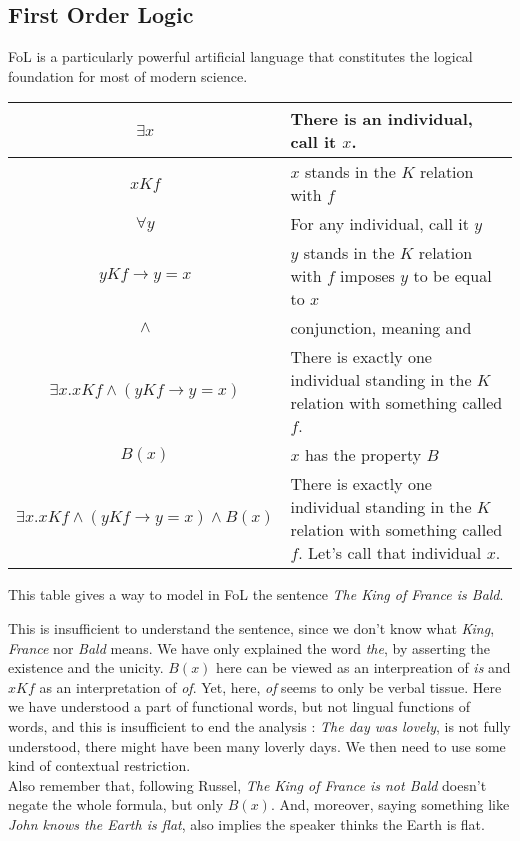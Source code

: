 \documentclass{cours}
\begin{document}
\subsection{First Order Logic}
FoL is a particularly powerful artificial language that constitutes the logical foundation for most of modern science. 
\begin{center}
    \begin{tabular}{cp{}}
        $\exists x$ & There is an individual, call it $x$.\\
        \midrule
        $xKf$ & $x$ stands in the $K$ relation with $f$\\
        \midrule
        $\forall y$ & For any individual, call it $y$\\
        \midrule
        $yKf \rightarrow y = x$ & $y$ stands in the $K$ relation with $f$ imposes $y$ to be equal to $x$\\
        \midrule
        $\wedge$ & conjunction, meaning and\\
        \midrule
        $\exists x.xKf\wedge \left(yKf \rightarrow y = x\right)$ & There is exactly one individual standing in the $K$ relation with something called $f$.\\
        \midrule
        $B(x)$ & $x$ has the property $B$\\
        \midrule
        $\exists x.xKf\wedge \left(yKf \rightarrow y = x\right) \wedge B(x)$ & There is exactly one individual standing in the $K$ relation with something called $f$. Let's call that individual $x$.
    \end{tabular}
\end{center}
This table gives a way to model in FoL the sentence \textsl{The King of France is Bald}.

This is insufficient to understand the sentence, since we don't know what \textsl{King}, \textsl{France} nor \textsl{Bald} means. We have only explained the word \textsl{the}, by asserting the existence and the unicity. $B(x)$ here can be viewed as an interpreation of \textsl{is} and $xKf$ as an interpretation of \textsl{of}. Yet, here, \textsl{of} seems to only be verbal tissue. Here we have understood a part of functional words, but not lingual functions of words, and this is insufficient to end the analysis : \textsl{The day was lovely}, is not fully understood, there might have been many loverly days. We then need to use some kind of contextual restriction. \\
Also remember that, following Russel, \textsl{The King of France is not Bald} doesn't negate the whole formula, but only $B(x)$. And, moreover, saying something like \textsl{John knows the Earth is flat}, also implies the speaker thinks the Earth is flat. \\
\end{document}
